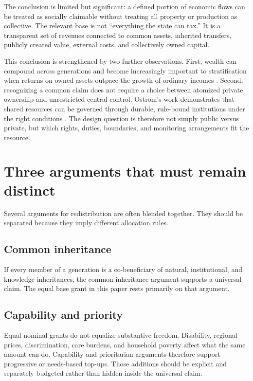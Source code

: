 \documentclass[11pt]{article}
\begin{document}
The conclusion is limited but significant: a defined portion of economic flows can be
treated as socially claimable without treating all property or production as collective.
The relevant base is not ``everything the state can tax.'' It is a transparent set of
revenues connected to common assets, inherited transfers, publicly created value,
external costs, and collectively owned capital.

This conclusion is strengthened by two further observations. First, wealth can compound
across generations and become increasingly important to stratification when returns on
owned assets outpace the growth of ordinary incomes \cite{piketty2014}. Second,
recognizing a common claim does not require a choice between atomized private ownership
and unrestricted central control. Ostrom's work demonstrates that shared resources can
be governed through durable, rule-bound institutions under the right conditions
\cite{ostrom1990}. The design question is therefore not simply public versus private,
but which rights, duties, boundaries, and monitoring arrangements fit the resource.

\section{Three arguments that must remain distinct}

Several arguments for redistribution are often blended together. They should be
separated because they imply different allocation rules.

\subsection{Common inheritance}

If every member of a generation is a co-beneficiary of natural, institutional, and
knowledge inheritances, the common-inheritance argument supports a universal claim.
The equal base grant in this paper rests primarily on that argument.

\subsection{Capability and priority}

Equal nominal grants do not equalize substantive freedom. Disability, regional prices,
discrimination, care burdens, and household poverty affect what the same amount can do.
Capability and prioritarian arguments therefore support progressive or needs-based
top-ups. Those additions should be explicit and separately budgeted rather than hidden
inside the universal claim.
\end{document}
